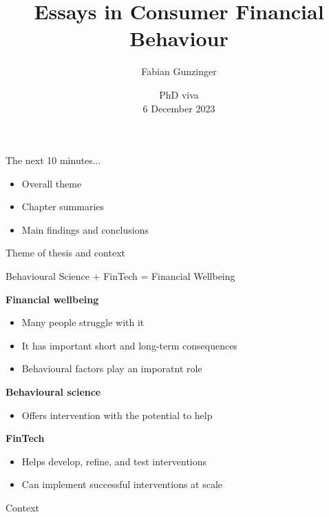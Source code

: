 \documentclass[xcolor=svgnames]{beamer}
\title{Essays in Consumer Financial Behaviour}
\author{Fabian Gunzinger \inst{1}}
\institute
{
    \inst{1}%
    University of Warwick\\
    \url{fabian.gunzinger@warwick.ac.uk}
}
\date {PhD viva \\ \vspace{1mm} 6 December 2023}
\begin{document}
\begin{frame}
  \titlepage
\end{frame}

\begin{frame}{The next 10 minutes...}
    \begin{itemize}
        \item Overall theme
        \item Chapter summaries
        \item Main findings and conclusions
    \end{itemize}
\end{frame}

\begin{frame}{Theme of thesis and context}

    Behavioural Science + FinTech = Financial Wellbeing

    \vspace{1cm}
    
    \textbf{Financial wellbeing}
    \begin{itemize}
        \item Many people struggle with it
        \item It has important short and long-term consequences
        \item Behavioural factors play an imporatnt role
    \end{itemize}
    \textbf{Behavioural science}
    \begin{itemize}
        \item Offers intervention with the potential to help
    \end{itemize}    
    \textbf{FinTech}
    \begin{itemize}
        \item Helps develop, refine, and test interventions
        \item Can implement successful interventions at scale
    \end{itemize}
\end{frame}

\begin{frame}{Context}

\end{frame}
\end{document}
